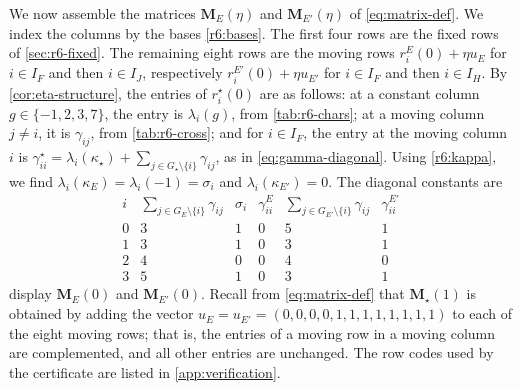 We now assemble the matrices $\mathbf M_E(\eta)$ and $\mathbf M_{E'}(\eta)$ of \eqref{eq:matrix-def}. We index the columns by the bases \eqref{r6:bases}. The first four rows are the fixed rows of \cref{sec:r6-fixed}. The remaining eight rows are the moving rows $r^E_i(0)+\eta u_E$ for $i\in I_F$ and then $i\in I_J$, respectively $r^{E'}_i(0)+\eta u_{E'}$ for $i\in I_F$ and then $i\in I_H$. By \cref{cor:eta-structure}, the entries of $r^\star_i(0)$ are as follows: at a constant column $g\in\{-1,2,3,7\}$, the entry is $\lambda_i(g)$, from \cref{tab:r6-chars}; at a moving column $j\ne i$, it is $\gamma_{ij}$, from \cref{tab:r6-cross}; and for $i\in I_F$, the entry at the moving column $i$ is $\gamma^\star_{ii}=\lambda_i(\kappa_\star)+\sum_{j\in G_\star\setminus\{i\}}\gamma_{ij}$, as in \eqref{eq:gamma-diagonal}. Using \eqref{r6:kappa}, we find $\lambda_i(\kappa_E)=\lambda_i(-1)=\sigma_i$ and $\lambda_i(\kappa_{E'})=0$. The diagonal constants are
\[
\begin{array}{c|ccc|cc}
i & \sum_{j\in G_E\setminus\{i\}}\gamma_{ij} & \sigma_i & \gamma^E_{ii} & \sum_{j\in G_{E'}\setminus\{i\}}\gamma_{ij} & \gamma^{E'}_{ii}\\
\hline
0 & 3 & 1 & 0 & 5 & 1 \\
1 & 3 & 1 & 0 & 3 & 1 \\
2 & 4 & 0 & 0 & 4 & 0 \\
3 & 5 & 1 & 0 & 3 & 1
\end{array}
\]
 display $\mathbf M_E(0)$ and $\mathbf M_{E'}(0)$. Recall from \eqref{eq:matrix-def} that $\mathbf M_\star(1)$ is obtained by adding the vector $u_E=u_{E'}=(0,0,0,0,1,1,1,1,1,1,1,1)$ to each of the eight moving rows; that is, the entries of a moving row in a moving column are complemented, and all other entries are unchanged. The row codes used by the certificate are listed in \cref{app:verification}.

